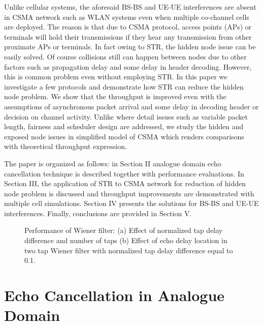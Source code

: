 \documentclass[twocolumn]{IEEEtran}
\begin{document}
Unlike cellular systems, the aforesaid BS-BS and UE-UE interferences
are absent in CSMA network such as WLAN systems even when multiple
co-channel cells are deployed. The reason is that due to CSMA
protocol, access points (APs) or terminals will hold their
transmissions if they hear any transmission from other proximate APs
or terminals. In fact owing to STR, the hidden node issue can be
easily solved. Of course collisions still can happen between nodes
due to other factors such as propagation delay and some delay in
header decoding. However, this is common problem even without
employing STR. In this paper we investigate a few protocols and
demonstrate how STR can reduce the hidden node problem. We show that
the throughput is improved even with the assumptions of asynchronous
packet arrival and some delay in decoding header or decision on
channel activity. Unlike \cite{mac1} where detail issues such as
variable packet length, fairness and scheduler design are addressed,
we study the hidden and exposed node issues in simplified model of
CSMA which renders comparisons with theoretical throughput
expression.

The paper is organized as follows: in Section II analogue domain
echo cancellation technique is described together with performance
evaluations. In Section III, the application of STR to CSMA network
for reduction of hidden node problem is discussed and throughput
improvements are demonstrated with multiple cell simulations.
Section IV presents the solutions for BS-BS and UE-UE interferences.
Finally, conclusions are provided in Section V.



\begin{figure*}[!ht]

\centerline{ 
    \hfil
{}}


\caption{Performance of Wiener filter: (a) Effect of normalized tap
delay difference and number of taps (b) Effect of echo delay
location in two tap Wiener filter with normalized tap delay
difference equal to 0.1.} \label{fig_mse}

\end{figure*}

\section{Echo Cancellation in Analogue Domain}
\end{document}
